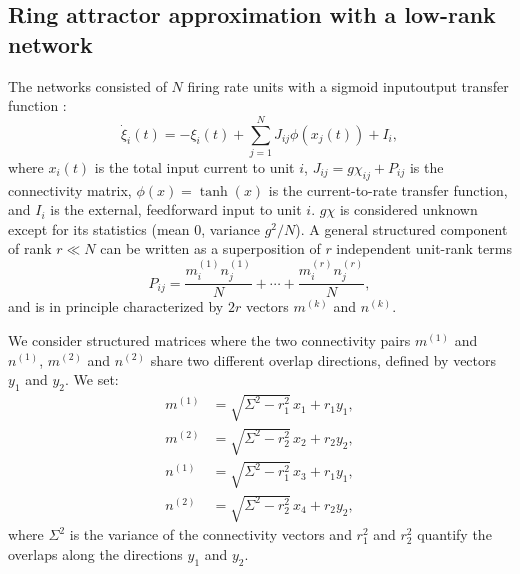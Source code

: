 \documentclass{article} %
\newcounter{ct}
\theoremstyle{definition}
\theoremstyle{remark}
\begin{document}




\subsection{Ring attractor approximation with a low-rank network}\label{sec:supp:lowrank}
The networks consisted of \(N\) firing rate units with a sigmoid inputoutput transfer function \citep{mastrogiuseppe2018}:
\begin{equation}
\dot \xi_{i}(t) = - \xi_{i}(t) + \sum_{j = 1}^{N} J_{ij}\phi(x_{j}(t)) + I_{i},
\label{eq:1}
\end{equation}where \(x_{i}(t)\) is the total input current to unit \(i\),
\( J_{ij} = g\chi_{ij} + P_{ij}\) is the connectivity matrix,
\(\phi(x) = \tanh(x)\) is the current-to-rate transfer function, and \(I_{i}\) is the external, feedforward input to unit \(i\).
\(g\chi\) is considered unknown except for its statistics (mean 0, variance \(g^{2}/N\)).
A general structured component of rank \(r\ll N\) can be written as a superposition of \(r\) independent unit-rank terms
\begin{equation}
P_{ij} = \frac{m_{i}^{(1)} n_{j}^{(1)}}{N} + \cdots + \frac{m_{i}^{(r)} n_{j}^{(r)}}{N},
\end{equation} and is in principle characterized by \(2r\) vectors \(m^{(k)}\) and \(n^{(k)}\).


We consider structured matrices where the two connectivity pairs \( m^{(1)} \) and \( n^{(1)} \), \( m^{(2)} \) and \( n^{(2)} \) share two different overlap directions, defined by vectors \( y_{1} \) and \( y_{2} \). We set:
\begin{align}
    m^{(1)} &= \sqrt{\Sigma^{2} - r_{1}^{2}} \, x_{1} + r_{1} y_{1}, \\
    m^{(2)} &= \sqrt{\Sigma^{2} - r_{2}^{2}} \, x_{2} + r_{2} y_{2}, \\
    n^{(1)} &= \sqrt{\Sigma^{2} - r_{1}^{2}} \, x_{3} + r_{1} y_{1}, \\
    n^{(2)} &= \sqrt{\Sigma^{2} - r_{2}^{2}} \, x_{4} + r_{2} y_{2},
\end{align}
where \( \Sigma^{2} \) is the variance of the connectivity vectors and \( r_{1}^{2} \) and \( r_{2}^{2} \) quantify the overlaps along the directions \( y_{1} \) and \( y_{2} \).
\end{document}

